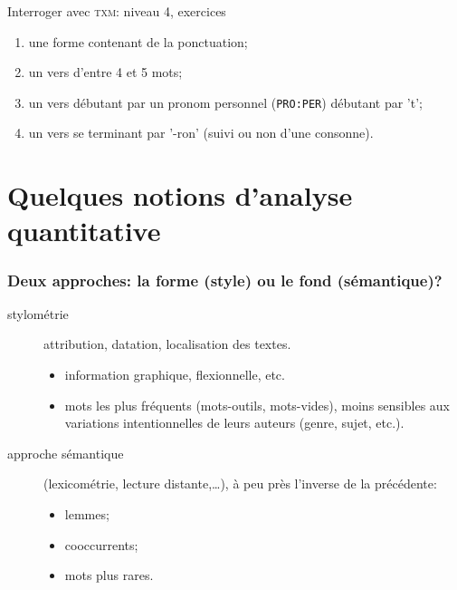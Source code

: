 \documentclass{beamer}
\begin{document}
\begin{frame}{Interroger avec \textsc{txm}: niveau 4, exercices}

\begin{enumerate}
	\item une forme contenant de la ponctuation;
	\item un vers d'entre 4 et 5 mots;
	\item un vers débutant par un pronom personnel (\texttt{PRO:PER}) débutant par 't';
	\item un vers se terminant par '-ron' (suivi ou non d'une consonne).
\end{enumerate}

\end{frame}

\section{Quelques notions d'analyse quantitative}

\begin{frame}[fragile]
\frametitle{Deux approches: la forme (style) ou le fond (sémantique)?}

\begin{description}
	\item[stylométrie] attribution, datation, localisation des textes. 
		\begin{itemize}
			\item information graphique, flexionnelle, etc. 
			\item \alert{mots les plus fréquents} (mots-outils, mots-vides), moins sensibles aux variations intentionnelles de leurs auteurs (genre, sujet, etc.).
		\end{itemize}
	\item[approche sémantique] (lexicométrie, lecture distante,…), à peu près l'inverse de la précédente: 
		\begin{itemize}
			\item lemmes;
			\item cooccurrents;
			\item mots plus rares.
		\end{itemize}
\end{description}

\end{frame}



\end{document}
